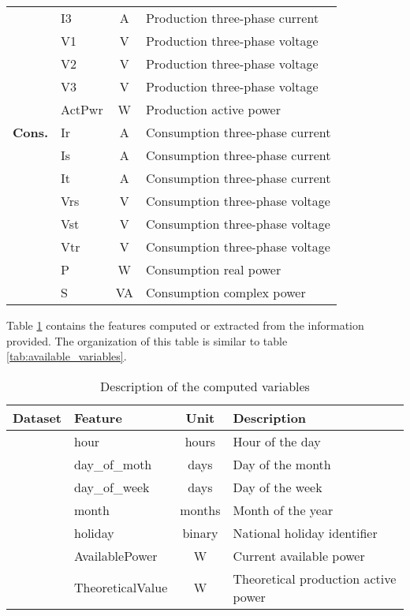 \begin{longtable}{rlcl}
      & I3 & A & Production three-phase current \\
      & V1 & V & Production three-phase voltage \\
      & V2 & V & Production three-phase voltage \\
      & V3 & V & Production three-phase voltage \\
      & ActPwr & W & Production active power \\
    \midrule
    \multicolumn{1}{l}{\textbf{Cons.}} & Ir & A & Consumption three-phase current \\
      & Is & A & Consumption three-phase current \\
      & It & A & Consumption three-phase current \\
      & Vrs & V & Consumption three-phase voltage \\
      & Vst & V & Consumption three-phase voltage \\
      & Vtr & V & Consumption three-phase voltage \\
      & P & W & Consumption real power \\
      & S & VA & Consumption complex power \\
    \end{longtable}%
  
Table \ref{tab:computed_variables} contains the features computed or extracted from the information provided. The organization of this table is similar to table \ref{tab:available_variables}.

\begin{table}[htbp]
  \centering
  \caption{Description of the computed variables}
    \begin{tabular}{rlcl}
    \toprule
    \multicolumn{1}{l}{\textbf{Dataset}} & \textbf{Feature} & \textbf{Unit} & \textbf{Description} \\
    \midrule
      & hour & hours & Hour of the day \\
      & day\_of\_moth & days & Day of the month \\
      & day\_of\_week & days & Day of the week \\
      & month & months & Month of the year \\
      & holiday & binary & National holiday identifier \\
      & AvailablePower & W & Current available power \\
      & TheoreticalValue & W & Theoretical production active power \\
    \end{tabular}%
  \label{tab:computed_variables}%
\end{table}%
